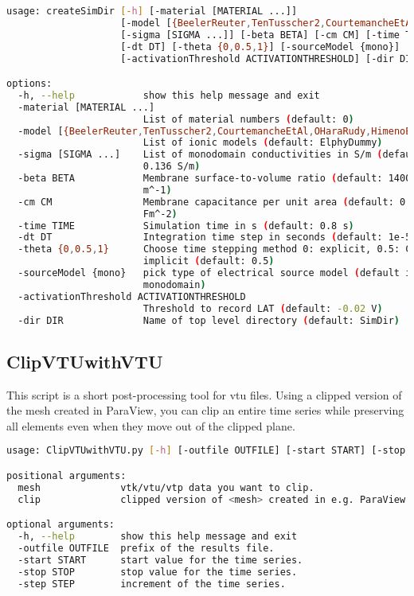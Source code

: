 \begin{lstlisting}[language=bash,caption=Syntax for createSimDir.py]
usage: createSimDir [-h] [-material [MATERIAL ...]]
                    [-model [{BeelerReuter,TenTusscher2,CourtemancheEtAl,OHaraRudy,HimenoEtAl,KoivumaekiEtAl,GrandiEtAlVentricle,GrandiEtAlAtrium} ...]]
                    [-sigma [SIGMA ...]] [-beta BETA] [-cm CM] [-time TIME]
                    [-dt DT] [-theta {0,0.5,1}] [-sourceModel {mono}]
                    [-activationThreshold ACTIVATIONTHRESHOLD] [-dir DIR]

options:
  -h, --help            show this help message and exit
  -material [MATERIAL ...]
                        List of material numbers (default: 0)
  -model [{BeelerReuter,TenTusscher2,CourtemancheEtAl,OHaraRudy,HimenoEtAl,KoivumaekiEtAl,GrandiEtAlVentricle,GrandiEtAlAtrium} ...]
                        List of ionic models (default: ElphyDummy)
  -sigma [SIGMA ...]    List of monodomain conductivities in S/m (default:
                        0.136 S/m)
  -beta BETA            Membrane surface-to-volume ratio (default: 140000
                        m^-1)
  -cm CM                Membrane capacitance per unit area (default: 0.01
                        Fm^-2)
  -time TIME            Simulation time in s (default: 0.8 s)
  -dt DT                Integration time step in seconds (default: 1e-5 s)
  -theta {0,0.5,1}      Choose time stepping method 0: explicit, 0.5: CN, 1:
                        implicit (default: 0.5)
  -sourceModel {mono}   pick type of electrical source model (default is
                        monodomain)
  -activationThreshold ACTIVATIONTHRESHOLD
                        Threshold to record LAT (default: -0.02 V)
  -dir DIR              Name of top level directory (default: SimDir)
\end{lstlisting}

\subsection{ClipVTUwithVTU}
\label{tools:ClipVTUwithVTU}

This script is a short post-processing tool for vtu files.
Using a clipped version of the mesh created in \eg ParaView, you can clip an entire time series while preserving all elements even when they move out of the clipped plane. 

\begin{lstlisting}[language=bash,caption=Syntax for ClipVTUwithVTU.py]
usage: ClipVTUwithVTU.py [-h] [-outfile OUTFILE] [-start START] [-stop STOP] [-step STEP] mesh clip

positional arguments:
  mesh              vtk/vtu/vtp data you want to clip.
  clip              clipped version of <mesh> created in e.g. ParaView invtu/vtk/vtp.

optional arguments:
  -h, --help        show this help message and exit
  -outfile OUTFILE  prefix of the results file.
  -start START      start value for the time series.
  -stop STOP        stop value for the time series.
  -step STEP        increment of the time series.

\end{lstlisting}